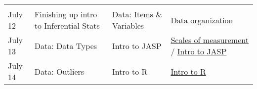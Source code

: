 \documentclass[
]{book}
\begin{document}
\begin{longtable}[]{@{}llll@{}}
\begin{minipage}[t]{0.29\columnwidth}
\strut
\end{minipage} & \begin{minipage}[t]{0.18\columnwidth}\raggedright
\strut
\end{minipage}\tabularnewline
\begin{minipage}[t]{0.09\columnwidth}\raggedright
July 12\strut
\end{minipage} & \begin{minipage}[t]{0.32\columnwidth}\raggedright
Finishing up intro to Inferential Stats\strut
\end{minipage} & \begin{minipage}[t]{0.29\columnwidth}\raggedright
Data: Items \& Variables\strut
\end{minipage} & \begin{minipage}[t]{0.18\columnwidth}\raggedright
\href{http://gureckislab.org/courses/fall20/labincp/chapters/05/00-data.html\#data-organization-tidy-and-wide-formats}{Data organization}\strut
\end{minipage}\tabularnewline
\begin{minipage}[t]{0.09\columnwidth}\raggedright
July 13\strut
\end{minipage} & \begin{minipage}[t]{0.32\columnwidth}\raggedright
Data: Data Types\strut
\end{minipage} & \begin{minipage}[t]{0.29\columnwidth}\raggedright
Intro to JASP\strut
\end{minipage} & \begin{minipage}[t]{0.18\columnwidth}\raggedright
\href{https://learningstatisticswithr.com/book/studydesign.html\#scales}{Scales of measurement} / \href{https://tomfaulkenberry.github.io/JASPbook/chapters/chapter3.pdf}{Intro to JASP}\strut
\end{minipage}\tabularnewline
\begin{minipage}[t]{0.09\columnwidth}\raggedright
July 14\strut
\end{minipage} & \begin{minipage}[t]{0.32\columnwidth}\raggedright
Data: Outliers\strut
\end{minipage} & \begin{minipage}[t]{0.29\columnwidth}\raggedright
Intro to R\strut
\end{minipage} & \begin{minipage}[t]{0.18\columnwidth}\raggedright
\href{https://learningstatisticswithr.com/book/introR.html}{Intro to R}\strut
\end{minipage}\tabularnewline

\end{longtable}
\end{document}
